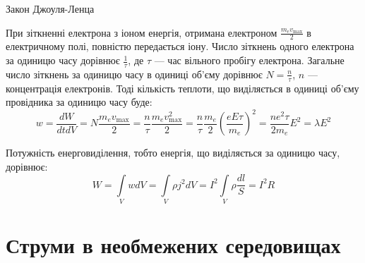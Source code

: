 \documentclass[onlytextwidth]{beamer}
\begin{document}
\begin{frame}{Закон Джоуля-Ленца}{}
	\begin{block}{}\justifying
		При зіткненні електрона з іоном енергія, отримана електроном $ \frac{m_e v_{\max}}2$ в електричному полі, повністю передається іону. Число
		зіткнень одного електрона за одиницю часу дорівнює $\frac1{\tau}$, де $\tau$ --- час вільного пробігу електрона. Загальне число зіткнень за
		одиницю часу в одиниці об'єму дорівнює $N = \frac{n}{\tau}$, $n$ --- концентрація електронів. Тоді кількість теплоти, що виділяється в одиниці об'єму
		провідника за одиницю часу буде:
		\begin{equation*}
			w = \frac{dW}{dt dV} = N \frac{m_e v_{\max}}2 = \frac{n}\tau \frac{m_e v^2_{\max}}2 =
			\frac{n}\tau \frac{m_e}2 \left( \frac{eE\tau}{m_e} \right)^2 =  \frac{ne^2\tau}{2m_e} E^2 = \lambda E^2
		\end{equation*}

		Потужність енерговиділення, тобто енергія, що виділяється за одиницю часу, дорівнює:
		\begin{equation*}
			W = \int\limits_V w dV = \int\limits_V \rho j^2 dV = I^2 \int\limits_V \rho\frac{dl}{S} = I^2 R
		\end{equation*}

	\end{block}
\end{frame}




\section{Струми в необмежених середовищах}
\end{document}

